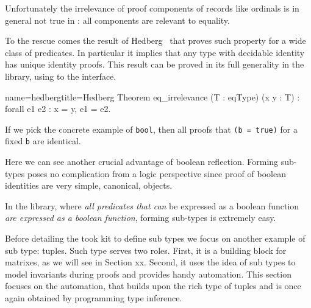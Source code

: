 Unfortunately the irrelevance of proof components of records like
ordinals is in general not true in \mcbCIC{}: all
components are relevant to equality.

To the rescue comes the result of Hedberg~\cite{Hedberg}
that proves such property for a wide class of predicates.
In particular it implies that any type with decidable identity
has unique identity proofs. This result can be proved in its full generality
in the \mcbMC{} library, using to the  interface.

\begin{coq}{name=hedberg}{title=Hedberg}
Theorem eq_irrelevance (T : eqType) (x y : T) : forall e1 e2 : x = y, e1 = e2.
\end{coq}

If we pick the concrete example of \lstinline/bool/,
then all proofs that \lstinline/(b = true)/
for a fixed \lstinline/b/ are identical.

Here we can see another crucial advantage of boolean reflection.
Forming sub-types poses no complication from a logic perspective since
proof of boolean identities are very simple, canonical, objects.

In the \mcbMC{} library, where \emph{all predicates that can} be
expressed as a boolean function \emph{are expressed as a boolean
function}, forming sub-types is extremely easy.

\mcbLEARN{}
\mcbNOTES{}

Before detailing the took kit to define sub types we focus on
another example of sub type: tuples.  Such type serves two roles.
First, it is a building block for matrixes, as we will see in Section
xx.  Second, it uses the idea of sub types to model invariants during
proofs and provides handy automation.  This section focuses on the
automation, that builds upon the rich type of tuples and is once again
obtained by programming type inference.


